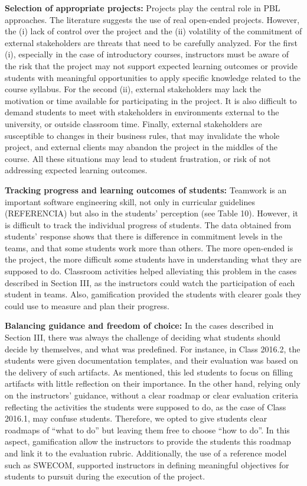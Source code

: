 \textbf{Selection of appropriate projects:} Projects play the central role in PBL approaches. The literature suggests the use of real open-ended projects. However, the (i) lack of control over the project and the (ii) volatility of the commitment of external stakeholders are threats that need to be carefully analyzed. For the first (i), especially in the case of introductory courses, instructors must be aware of the risk that the project may not support expected learning outcomes or provide students with meaningful opportunities to apply specific knowledge related to the course syllabus. For the second (ii), external stakeholders may lack the motivation or time available for participating in the project. It is also difficult to demand students to meet with stakeholders in environments external to the university, or outside classroom time. Finally, external stakeholders are susceptible to changes in their business rules, that may invalidate the whole project, and external clients may abandon the project in the middles of the course. All these situations may lead to student frustration, or risk of not addressing expected learning outcomes.

\textbf{Tracking progress and learning outcomes of students:} Teamwork is an important software engineering skill, not only in curricular guidelines (REFERENCIA) but also in the students’ perception (see Table 10). However, it is difficult to track the individual progress of students. The data obtained from students’ response shows that there is difference in commitment levels in the teams, and that some students work more than others. The more open-ended is the project, the more difficult some students have in understanding what they are supposed to do. Classroom activities helped alleviating this problem in the cases described in Section III, as the instructors could watch the participation of each student in teams. Also, gamification provided the students with clearer goals they could use to measure and plan their progress.

\textbf{Balancing guidance and freedom of choice:} In the cases described in Section III, there was always the challenge of deciding what students should decide by themselves, and what was predefined. For instance, in Class 2016.2, the students were given documentation templates, and their evaluation was based on the delivery of such artifacts. As mentioned, this led students to focus on filling artifacts with little reflection on their importance. In the other hand, relying only on the instructors’ guidance, without a clear roadmap or clear evaluation criteria reflecting the activities the students were supposed to do, as the case of Class 2016.1, may confuse students. Therefore, we opted to give students clear roadmaps of “what to do” but leaving them free to choose “how to do”. In this aspect, gamification allow the instructors to provide the students this roadmap and link it to the evaluation rubric. Additionally, the use of a reference model such as SWECOM, supported instructors in defining meaningful objectives for students to pursuit during the execution of the project. 

